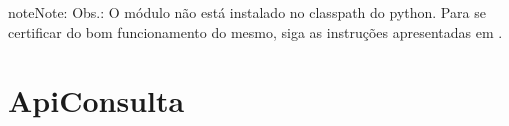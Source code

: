 \documentclass[letterpaper,10pt,brazil]{sphinxmanual}
\begin{document}
\begin{sphinxadmonition}{note}{Note:}
\sphinxAtStartPar
Obs.: O módulo não está instalado no classpath do python. Para se certificar do bom
funcionamento do mesmo, siga as instruções apresentadas em {\hyperref[\detokenize{usage:como-usar-pdc-api}]{}}.
\end{sphinxadmonition}

\sphinxstepscope


\section{ApiConsulta}
\label{\detokenize{api_gen/apiModulo.api_consulta:apiconsulta}}\label{\detokenize{api_gen/apiModulo.api_consulta::doc}}
\end{document}
